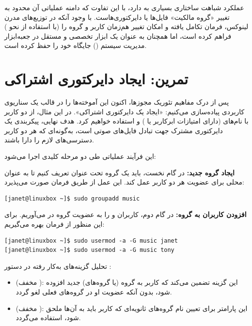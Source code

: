 عملکرد  شباهت ساختاری بسیاری به  دارد، با این تفاوت که دامنه عملیاتی آن محدود به تغییر «گروه مالکیت» فایل‌ها یا دایرکتوری‌هاست. با وجود آنکه در توزیع‌های مدرن لینوکس، فرمان  تکامل یافته و امکان تغییر هم‌زمان کاربر و گروه را (با استفاده از نحو ) فراهم کرده است، اما  همچنان به عنوان یک ابزار تخصصی و مستقل در جعبه‌ابزار مدیریت سیستم () جایگاه خود را حفظ کرده است.

\section{تمرین: ایجاد دایرکتوری اشتراکی}

پس از درک مفاهیم تئوریک مجوزها، اکنون این آموخته‌ها را در قالب یک سناریوی کاربردی پیاده‌سازی می‌کنیم: «ایجاد یک دایرکتوری اشتراکی». در این مثال، از دو کاربر با نام‌های  (دارای امتیازات ابرکاربر یا ) و  استفاده خواهیم کرد. هدف نهایی، پیکربندی یک دایرکتوری مشترک جهت تبادل فایل‌های صوتی است، به‌گونه‌ای که هر دو کاربر دسترسی‌های لازم را دارا باشند.

این فرآیند عملیاتی طی دو مرحله کلیدی اجرا می‌شود:

\textbf{ایجاد گروه جدید:} در گام نخست، باید یک گروه تحت عنوان  تعریف کنیم تا به عنوان محلی برای عضویت هر دو کاربر عمل کند. این عمل از طریق فرمان  صورت می‌پذیرد:

\begin{latin}
\begin{lstlisting}
[janet@linuxbox ~]$ sudo groupadd music
\end{lstlisting}
\end{latin}

\textbf{افزودن کاربران به گروه:} در گام دوم، کاربران  و  را به عضویت گروه  در می‌آوریم. برای این منظور از فرمان  بهره می‌گیریم:

\begin{latin}
\begin{lstlisting}
[janet@linuxbox ~]$ sudo usermod -a -G music janet
[janet@linuxbox ~]$ sudo usermod -a -G music tony
\end{lstlisting}
\end{latin}

تحلیل گزینه‌های به‌کار رفته در دستور :

\begin{itemize}
  \item {} (مخفف ): این گزینه تضمین می‌کند که کاربر به گروه (یا گروه‌های) جدید افزوده شود، بدون آنکه عضویت او در گروه‌های فعلی لغو گردد.
  \item {} (مخفف ): این پارامتر برای تعیین نام گروه‌های ثانویه‌ای که کاربر باید به آن‌ها ملحق شود، استفاده می‌گردد.
\end{itemize}

